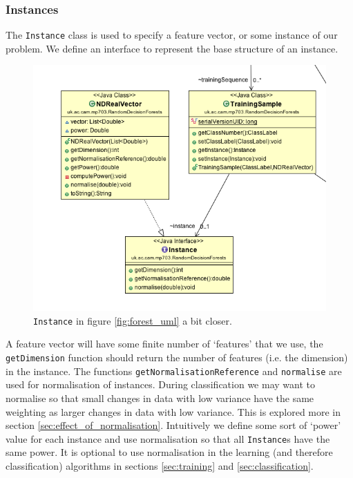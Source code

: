 \documentclass[12pt,twoside,notitlepage]{report}
\begin{document}
            \subsubsection{Instances}
                The \texttt{Instance} class is used to specify a feature vector, or some instance of our problem. We 
                define an interface to represent the base structure of an instance. 

                \begin{figure}[H]
                    \centering
                    \includegraphics[scale=0.5]{Instance_Forest_UML}
                    \caption{\texttt{Instance} in figure \ref{fig:forest_uml} a bit closer.}
                    \label{fig:instance_uml}
                \end{figure}

                A feature vector will have some finite number of `features' that we use, the \texttt{getDimension} 
                function should return the number of features (i.e. the dimension) in the instance. The functions 
                \texttt{getNormalisationReference} and \texttt{normalise} are used for normalisation of instances. 
                During classification we may want to normalise so that small changes in data with low variance have 
                the same weighting as larger changes in data with low variance. This is explored more in section 
                \ref{sec:effect_of_normalisation}. Intuitively we define some sort of `power' value for each instance 
                and use normalisation so that all \texttt{Instance}s have the same power. It is optional to use 
                normalisation in the learning (and therefore classification) algorithms in sections \ref{sec:training} 
                and \ref{sec:classification}. 
\end{document}
